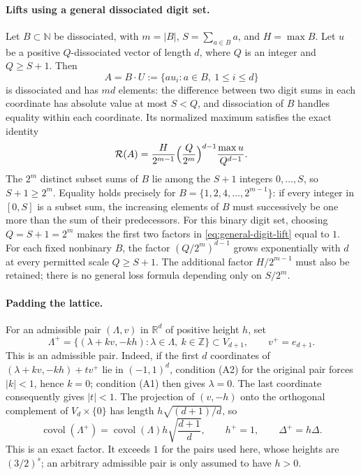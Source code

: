 \documentclass[12pt]{article}
\newcommand{\Z}{\mathbb{Z}}
\newcommand{\R}{\mathbb{R}}
\newcommand{\N}{\mathbb{N}}
\newcommand{\covol}{\operatorname{covol}}
\newcommand{\Lat}{\Lambda}
\begin{document}
\paragraph{Lifts using a general dissociated digit set.}
Let $B\subset\N$ be dissociated, with $m=|B|$, $S=\sum_{a\in B}a$,
and $H=\max B$. Let $u$ be a positive $Q$-dissociated vector of length
$d$, where $Q$ is an integer and $Q\ge S+1$. Then
\[
 A=B\cdot U:=\{a u_i:a\in B,\ 1\le i\le d\}
\]
is dissociated and has $md$ elements: the difference between two digit
sums in each coordinate has absolute value at most $S<Q$, and
dissociation of $B$ handles equality within each coordinate. Its
normalized maximum satisfies the exact identity
\begin{equation}\label{eq:general-digit-lift}
 \mathcal R(A)=
 \frac{H}{2^{m-1}}
 \Bigl(\frac{Q}{2^m}\Bigr)^{d-1}
 \frac{\max u}{Q^{d-1}}.
\end{equation}
The $2^m$ distinct subset sums of $B$ lie among the $S+1$ integers
$0,\dots,S$, so $S+1\ge2^m$. Equality holds precisely for
$B=\{1,2,4,\dots,2^{m-1}\}$: if every integer in $[0,S]$ is a subset
sum, the increasing elements of $B$ must successively be one more
than the sum of their predecessors. For this binary digit set,
choosing $Q=S+1=2^m$ makes the first two factors in
\eqref{eq:general-digit-lift} equal to $1$. For each fixed nonbinary
$B$, the factor $(Q/2^m)^{d-1}$ grows exponentially with $d$ at every
permitted scale $Q\ge S+1$. The additional factor $H/2^{m-1}$ must
also be retained; there is no general loss formula depending only
on $S/2^m$.

\paragraph{Padding the lattice.}
For an admissible pair $(\Lat,v)$ in $\R^d$ of positive height $h$,
set
\[
 \Lat^+=\{(\lambda+kv,-kh):\lambda\in\Lat,\ k\in\Z\}
 \subset V_{d+1},\qquad v^+=e_{d+1}.
\]
This is an admissible pair. Indeed, if the first $d$ coordinates of
$(\lambda+kv,-kh)+tv^+$ lie in $(-1,1)^d$, condition (A2) for the
original pair forces $|k|<1$, hence $k=0$; condition (A1) then gives
$\lambda=0$. The last coordinate consequently gives $|t|<1$.
The projection of $(v,-h)$ onto the orthogonal complement of
$V_d\times\{0\}$ has length $h\sqrt{(d+1)/d}$, so
\[
 \covol(\Lat^+)=\covol(\Lat)h\sqrt{\frac{d+1}{d}},
 \qquad h^+=1,\qquad \Delta^+=h\Delta.
\]
This is an exact factor. It exceeds $1$ for the pairs used here,
whose heights are $(3/2)^s$; an arbitrary admissible pair is only
assumed to have $h>0$.
\end{document}
